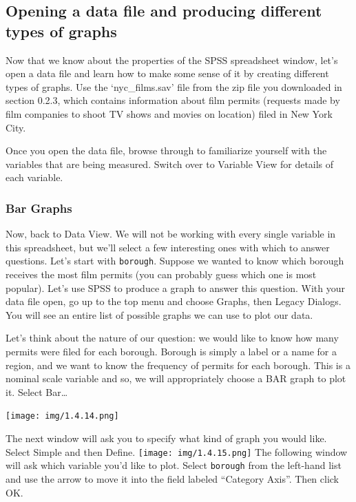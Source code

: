 \documentclass[
]{book}
\begin{document}
\hypertarget{opening-a-data-file-and-producing-different-types-of-graphs}{%
\subsection{Opening a data file and producing different types of graphs}\label{opening-a-data-file-and-producing-different-types-of-graphs}}

Now that we know about the properties of the SPSS spreadsheet window, let's open a data file and learn how to make some sense of it by creating different types of graphs. Use the `nyc\_films.sav' file from the zip file you downloaded in section 0.2.3, which contains information about film permits (requests made by film companies to shoot TV shows and movies on location) filed in New York City.

Once you open the data file, browse through to familiarize yourself with the variables that are being measured. Switch over to Variable View for details of each variable.

\hypertarget{bar-graphs}{%
\subsubsection{Bar Graphs}\label{bar-graphs}}

Now, back to Data View. We will not be working with every single variable in this spreadsheet, but we'll select a few interesting ones with which to answer questions. Let's start with \texttt{borough}. Suppose we wanted to know which borough receives the most film permits (you can probably guess which one is most popular). Let's use SPSS to produce a graph to answer this question. With your data file open, go up to the top menu and choose {Graphs}, then {Legacy Dialogs}. You will see an entire list of possible graphs we can use to plot our data.

Let's think about the nature of our question: we would like to know how many permits were filed for each borough. Borough is simply a label or a name for a region, and we want to know the frequency of permits for each borough. This is a nominal scale variable and so, we will appropriately choose a BAR graph to plot it. Select {Bar\ldots{}}

\texttt{[image: img/1.4.14.png]}

The next window will ask you to specify what kind of graph you would like. Select {Simple} and then {Define}.
\texttt{[image: img/1.4.15.png]}
The following window will ask which variable you'd like to plot. Select \texttt{borough} from the left-hand list and use the arrow to move it into the field labeled ``Category Axis''. Then click {OK}.
\end{document}
